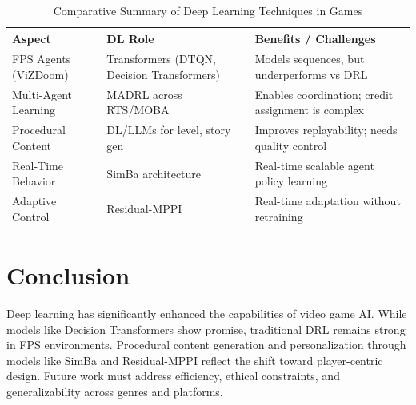 \documentclass[12pt]{article}
\begin{document}
\begin{table}[h!]
\centering
\small
\begin{tabular}{@{}p{3cm}p{5cm}p{6cm}@{}}
\toprule
\textbf{Aspect} & \textbf{DL Role} & \textbf{Benefits / Challenges} \\
\midrule
FPS Agents (ViZDoom) & Transformers (DTQN, Decision Transformers) & Models sequences, but underperforms vs DRL \cite{batth2025fps} \\
Multi-Agent Learning & MADRL across RTS/MOBA & Enables coordination; credit assignment is complex \cite{madrl2025review} \\
Procedural Content & DL/LLMs for level, story gen & Improves replayability; needs quality control \cite{gameai2025} \\
Real-Time Behavior & SimBa architecture & Real-time scalable agent policy learning \cite{simba2025} \\
Adaptive Control & Residual-MPPI & Real-time adaptation without retraining \cite{residualmppi2025} \\
\bottomrule
\end{tabular}
\caption{Comparative Summary of Deep Learning Techniques in Games}
\end{table}

\section{Conclusion}
Deep learning has significantly enhanced the capabilities of video game AI. While models like Decision Transformers show promise, traditional DRL remains strong in FPS environments. Procedural content generation and personalization through models like SimBa and Residual-MPPI reflect the shift toward player-centric design. Future work must address efficiency, ethical constraints, and generalizability across genres and platforms.
\end{document}
